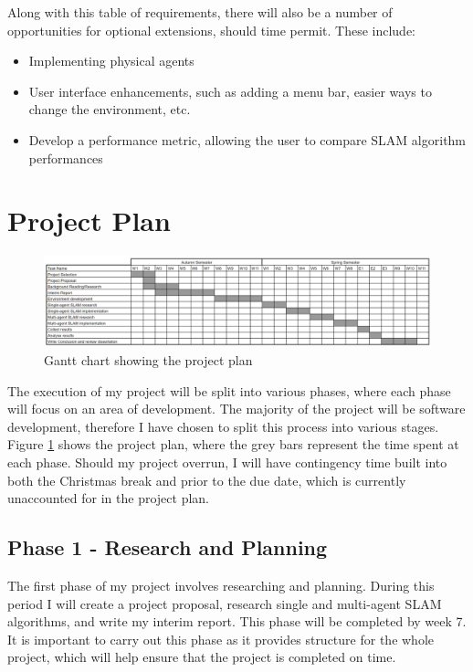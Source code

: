 \documentclass[12pt]{article}
\begin{document}
Along with this table of requirements, there will also be a number of opportunities for optional extensions, should time permit.
These include:
\begin{itemize}
    \item Implementing physical agents
    \item User interface enhancements, such as adding a menu bar, easier ways to change the environment, etc.
    \item Develop a performance metric, allowing the user to compare SLAM algorithm performances
\end{itemize}

\pagebreak

\section{Project Plan}
\begin{figure}[H]
    \centering
    \includegraphics[width=0.8\linewidth]{gantt_chart.png}
    \caption{Gantt chart showing the project plan}
    \label{fig:gantt_chart}
\end{figure}
The execution of my project will be split into various phases, where each phase will focus on an area of development. The
majority of the project will be software development, therefore I have chosen to split this process into various stages. Figure
\ref{fig:gantt_chart} shows the project plan, where the grey bars represent the time spent at each phase. Should my project
overrun, I will have contingency time built into both the Christmas break and prior to the due date, which is currently unaccounted
for in the project plan.\\

\subsection{Phase 1 - Research and Planning}
The first phase of my project involves researching and planning. During this period I will create a project proposal,
research single and multi-agent SLAM algorithms, and write my interim report. This phase will be completed by week 7. It is
important to carry out this phase as it provides structure for the whole project, which will help ensure that the project is
completed on time.
\end{document}
